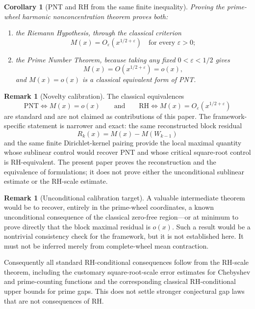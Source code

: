 \documentclass[11pt]{article}
\newtheorem{corollary}[theorem]{Corollary}
\theoremstyle{definition}
\newtheorem{remark}[theorem]{Remark}
\begin{document}
\begin{corollary}[PNT and RH from the same finite inequality]\label{cor:pnt-rh-same-inequality}
Proving the prime-wheel harmonic nonconcentration theorem proves both:
\begin{enumerate}
\item the Riemann Hypothesis, through the classical criterion
\[
M(x)=O_{\varepsilon}(x^{1/2+\varepsilon})
\quad\text{for every }\varepsilon>0;
\]
\item the Prime Number Theorem, because taking any fixed $0<\varepsilon<1/2$ gives
\[
M(x)=O(x^{1/2+\varepsilon})=o(x),
\]
and $M(x)=o(x)$ is a classical equivalent form of PNT.
\end{enumerate}
\end{corollary}

\begin{remark}[Novelty calibration]\label{rem:pnt-rh-novelty-calibration}
The classical equivalences
\[
\mathrm{PNT}\Longleftrightarrow M(x)=o(x)
\qquad\text{and}\qquad
\mathrm{RH}\Longleftrightarrow
M(x)=O_{\varepsilon}(x^{1/2+\varepsilon})
\]
are standard and are not claimed as contributions of this paper.  The framework-specific statement is narrower and exact: the same reconstructed block residual
\[
R_k(x)=M(x)-M(W_{k-1})
\]
and the same finite Dirichlet-kernel pairing provide the local maximal quantity whose sublinear control would recover PNT and whose critical square-root control is RH-equivalent.  The present paper proves the reconstruction and the equivalence of formulations; it does not prove either the unconditional sublinear estimate or the RH-scale estimate.
\end{remark}

\begin{remark}[Unconditional calibration target]\label{rem:unconditional-calibration}
A valuable intermediate theorem would be to recover, entirely in the prime-wheel coordinates, a known unconditional consequence of the classical zero-free region---or at minimum to prove directly that the block maximal residual is $o(x)$.  Such a result would be a nontrivial consistency check for the framework, but it is not established here.  It must not be inferred merely from complete-wheel mean contraction.
\end{remark}

Consequently all standard RH-conditional consequences follow from the RH-scale theorem, including the customary square-root-scale error estimates for Chebyshev and prime-counting functions and the corresponding classical RH-conditional upper bounds for prime gaps.  This does not settle stronger conjectural gap laws that are not consequences of RH.
\end{document}
